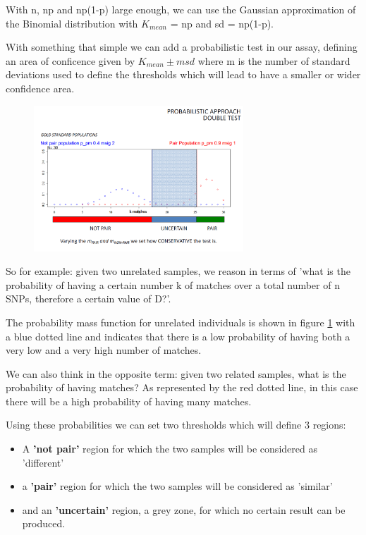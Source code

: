 With n, np and np(1-p) large enough, we can use the Gaussian approximation of
the Binomial distribution with $K_{mean}$ = np and sd = np(1-p). 

With something that simple we can add a probabilistic test in our assay,
defining an area of conficence given by $K_{mean} \pm m  sd$ where m is the
number of standard deviations used to define the thresholds which will lead to
have a smaller or wider confidence area. 

\begin{figure}
	\centering
	\includegraphics[width=0.7\textwidth]{Prob_test.PNG}
	\caption{\label{fig:prob_test}}
\end{figure}

\bigskip
So for example: given two unrelated samples, we reason in terms of 'what is the
probability of having a certain number k of matches over a total number of n
SNPs, therefore a certain value of D?'. 

The probability mass function for unrelated individuals is shown in figure
\ref{fig:prob_test} with a blue dotted line and indicates that there is a low
probability of having both a very low and a very high number of matches. 

We can also think in the opposite term: given two related samples, what is the
probability of having  matches? As represented by the red dotted line, in this
case there will be a high probability of having many matches. 

Using these probabilities we can set two thresholds which will define 3 regions:
\begin{itemize}
	\item A \textbf{'not pair'} region for which the two samples will be
	considered as 'different'
 	\item a \textbf{'pair'} region for which the two samples will be considered
 	as 'similar'
	\item and an \textbf{'uncertain'} region, a grey zone, for which no certain
	result can be produced. 
\end{itemize}


